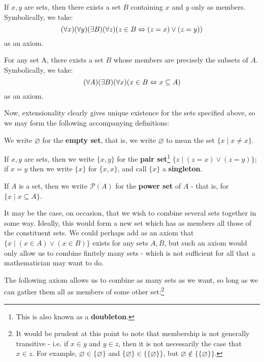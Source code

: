 \begin{axm} 
\label{Axiom: Pairs}
If $x, y$ are sets, then there exists a set $B$ containing $x$ and $y$ only as members. Symbolically, we take: $$(\forall x)(\forall y)(\exists B)(\forall z)(z\in B\Leftrightarrow (z=x)\lor (z=y))$$ as an axiom.
\end{axm}

\begin{axm} 
\label{Axiom: Power Sets}
For any set A, there exists a set $B$ whose members are precisely the subsets of $A$. Symbolically, we take: $$(\forall A)(\exists B)(\forall x)(x\in B \Leftrightarrow x\subseteq A)$$ as an axiom.
\end{axm}

Now, extensionality clearly gives unique existence for the sets specified above, so we may form the following accompanying definitions:

\begin{defn}
\label{Defn: Empty Set}
We write $\varnothing$ for the \textbf{empty set}, that is, we write $\varnothing$ to mean the set $\{x\mid x\neq x\}$. 
\end{defn}

\begin{defn}
\label{Defn: Pair Set}
If $x, y$ are sets, then we write $\{x, y\}$ for the \textbf{pair set}\footnote{This is also known as a \textbf{doubleton}.} $\{z\mid (z=x)\lor(z=y)\}$; if $x=y$ then we write $\{x\}$ for $\{x, x\}$, and call $\{x\}$ a \textbf{singleton}. 
\end{defn}

\begin{defn}
\label{Defn: Power Set}
If $A$ is a set, then we write $\mathcal{P}(A)$ for the \textbf{power set} of $A$ - that is, for $\{x\mid x\subseteq A\}$.  
\end{defn}

It may be the case, on occasion, that we wish to combine several sets together in some way. Ideally, this would form a new set which has as members all those of the constituent sets. We could perhaps add as an axiom that $\{x\mid (x\in A)\lor (x\in B)\}$ exists for any sets $A, B$, but such an axiom would only allow us to combine finitely many sets - which is not sufficient for all that a mathematician may want to do. 

The following axiom allows us to combine as many sets as we want, so long as we can gather them all as members of some other set:\footnote{It would be prudent at this point to note that membership is not generally transitive - i.e. if $x\in y$ and $y\in z$, then it is not necessarily the case that $x\in z$. For example, $\varnothing\in \{\varnothing\}$ and $\{\varnothing\}\in\{\{\varnothing\}\}$, but $\varnothing\notin\{\{\varnothing\}\}$.}

